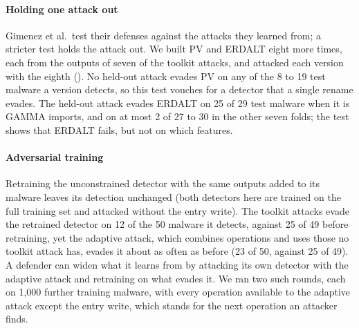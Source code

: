 \paragraph{Holding one attack out}
Gimenez et al.\ test their defenses against the attacks they learned from; a stricter test holds the attack out. We
built PV and ERDALT eight more times, each from the outputs of seven of the toolkit attacks, and attacked each version
with the eighth (). No held-out attack evades PV on any of the 8 to 19 test malware a version
detects, so this test vouches for a detector that a single rename evades. The held-out attack evades ERDALT on 25 of 29
test malware when it is GAMMA imports, and on at most 2 of 27 to 30 in the other seven folds; the test shows that
ERDALT fails, but not on which features.

\paragraph{Adversarial training}
Retraining the unconstrained detector with the same outputs added to its malware leaves its detection unchanged
(both detectors here are trained on the full training set and attacked without the entry write). The toolkit attacks
evade the retrained detector on 12 of the 50 malware it detects, against 25 of 49 before retraining, yet the adaptive
attack, which combines operations and uses those no toolkit attack has, evades it about as often as before (23 of 50,
against 25 of 49). A defender can widen
what it learns from by attacking its own detector with the adaptive attack and retraining on what evades it. We ran
two such rounds, each on 1,000 further training malware, with every operation available to the adaptive attack except
the entry write, which stands for the next operation an attacker finds. 

